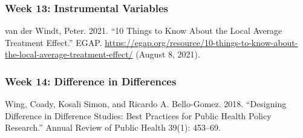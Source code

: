 \documentclass[
  11pt,
]{article}
\begin{document}
\hypertarget{week-13-instrumental-variables}{%
\subsubsection{Week 13: Instrumental
Variables}\label{week-13-instrumental-variables}}

van der Windt, Peter. 2021. ``10 Things to Know About the Local Average
Treatment Effect.'' EGAP.
\url{https://egap.org/resource/10-things-to-know-about-the-local-average-treatment-effect/}
(August 8, 2021).

\hypertarget{week-14-difference-in-differences}{%
\subsubsection{Week 14: Difference in
Differences}\label{week-14-difference-in-differences}}

Wing, Coady, Kosali Simon, and Ricardo A. Bello-Gomez. 2018. ``Designing
Difference in Difference Studies: Best Practices for Public Health
Policy Research.'' Annual Review of Public Health 39(1): 453--69.
\end{document}
